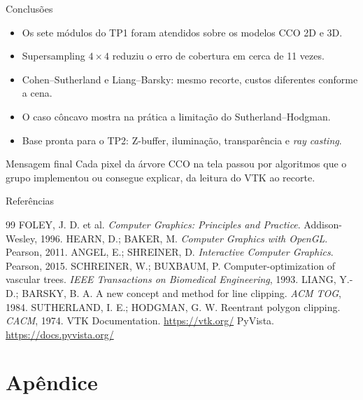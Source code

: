 \documentclass[aspectratio=169,11pt]{beamer}
\begin{document}
\begin{frame}{Conclusões}
\begin{itemize}
  \item Os sete módulos do TP1 foram atendidos sobre os modelos CCO 2D e 3D.
  \item Supersampling $4\times4$ reduziu o erro de cobertura em cerca de 11 vezes.
  \item Cohen--Sutherland e Liang--Barsky: mesmo recorte, custos diferentes conforme a cena.
  \item O caso côncavo mostra na prática a limitação do Sutherland--Hodgman.
  \item Base pronta para o TP2: Z-buffer, iluminação, transparência e \emph{ray casting}.
\end{itemize}

\vspace{0.25cm}

\begin{block}{Mensagem final}
Cada pixel da árvore CCO na tela passou por algoritmos que o grupo implementou ou consegue explicar, da leitura do VTK ao recorte.
\end{block}
\end{frame}

\begin{frame}{Referências}
\small
\begin{thebibliography}{99}
 FOLEY, J. D. et al. \textit{Computer Graphics: Principles and Practice}. Addison-Wesley, 1996.
 HEARN, D.; BAKER, M. \textit{Computer Graphics with OpenGL}. Pearson, 2011.
 ANGEL, E.; SHREINER, D. \textit{Interactive Computer Graphics}. Pearson, 2015.
 SCHREINER, W.; BUXBAUM, P. Computer-optimization of vascular trees. \textit{IEEE Transactions on Biomedical Engineering}, 1993.
 LIANG, Y.-D.; BARSKY, B. A. A new concept and method for line clipping. \textit{ACM TOG}, 1984.
 SUTHERLAND, I. E.; HODGMAN, G. W. Reentrant polygon clipping. \textit{CACM}, 1974.
 VTK Documentation. \url{https://vtk.org/} \quad PyVista. \url{https://docs.pyvista.org/}
\end{thebibliography}
\end{frame}

\appendix
\section{Apêndice}
\end{document}
